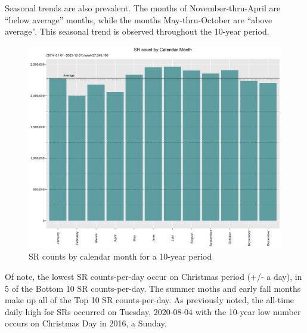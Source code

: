 \documentclass[12pt, titlepage]{article}
\begin{document}
Seasonal trends are also prevalent. The months of November-thru-April are ``below average'' months, while the months May-thru-October are ``above average''.
 This seasonal trend is observed throughout the 10-year period.

\begin{figure}[htbp]
  \centering
  \includegraphics[scale=0.65]{Calendar-Month.png}
  \caption{SR counts by calendar month for a 10-year period}
  \label{fig:calendar-months-counts}
\end{figure}

Of note, the lowest SR counts-per-day occur on Christmas  period (+/- a day), in 5 of the Bottom 10 SR counts-per-day. The summer moths and early
fall months make up all of the Top 10 SR counts-per-day. As previously noted, the all-time daily high for SRs occurred on Tuesday, 2020-08-04 with the 10-year
low number occurs on Christmas Day in 2016, a Sunday.
\end{document}
